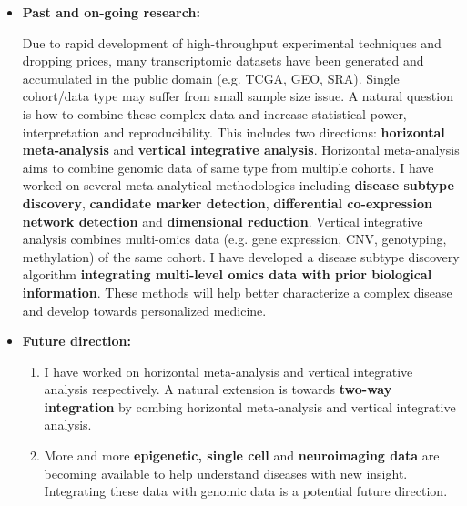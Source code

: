 \documentclass[a4paper, 10pt]{article}
\begin{document}
\begin{itemize}
\item \textbf{Past and on-going research:}

Due to rapid development of high-throughput experimental techniques and dropping prices, many transcriptomic datasets have
been generated and accumulated in the public domain (e.g. TCGA, GEO, SRA).
Single cohort/data type may suffer from small sample size issue.
A natural question is how to combine these complex data and increase statistical power, interpretation and reproducibility.
This includes two directions: \textbf{horizontal meta-analysis} and \textbf{vertical integrative analysis}. 
Horizontal meta-analysis aims to combine genomic data of same type from multiple cohorts.
I have worked on several meta-analytical methodologies including 
\textbf{disease subtype discovery}\cite{ref:MSKM}, 
\textbf{candidate marker detection}\cite{ref:BayesMP},
\textbf{differential co-expression network detection}\cite{ref:metaDCN}
and \textbf{dimensional reduction}\cite{ref:metaPCA}.
Vertical integrative analysis combines multi-omics data 
(e.g. gene expression, CNV, genotyping, methylation) of the same cohort.
I have developed a disease subtype discovery algorithm \textbf{integrating multi-level omics data with prior biological information}\cite{ref:ISKmeans}.
These methods will help better characterize a complex disease and develop towards personalized medicine.

\item \textbf{Future direction:}
\begin{enumerate}
\item I have worked on horizontal meta-analysis and vertical integrative analysis respectively. 
A natural extension is towards \textbf{two-way integration} by combing horizontal meta-analysis and vertical integrative analysis. 
\item 
More and more \textbf{epigenetic, single cell} and \textbf{neuroimaging data} are becoming available to help understand diseases with new insight.
Integrating these data with genomic data is a potential future direction.
\end{enumerate}

\end{itemize}
\end{document}
